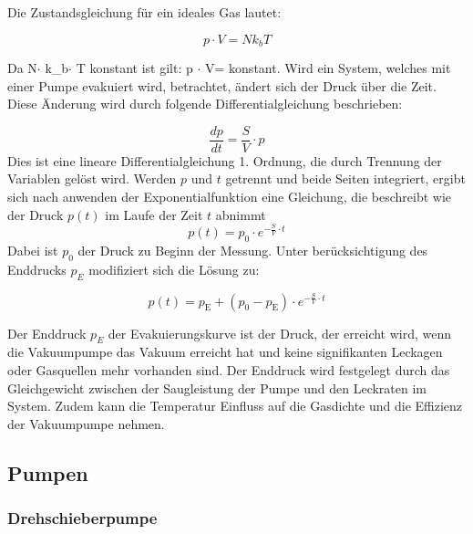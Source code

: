 Die Zustandsgleichung für ein ideales Gas lautet:

\begin{equation}
    p \cdot V=Nk_bT 
\end{equation}

Da N$\cdot$ k_b$\cdot$ T konstant ist gilt:  p $\cdot$ V= konstant.
Wird ein System, welches mit einer Pumpe evakuiert wird, betrachtet, ändert sich der Druck über die Zeit.
Diese Änderung wird durch folgende Differentialgleichung beschrieben:

\begin{equation}
    \frac{dp}{dt}=\frac{S}{V}\cdot p
\end{equation}
Dies ist eine lineare Differentialgleichung 1. Ordnung, die durch Trennung der Variablen gelöst wird.
Werden \(p \) und \(t \) getrennt und beide Seiten integriert, ergibt sich nach anwenden der Exponentialfunktion eine
Gleichung, die beschreibt wie der Druck \(p(t)\) im Laufe der Zeit \(t \) abnimmt
\begin{equation}
p(t)=p_0\cdot e^{-\frac{S}{V}\cdot t}
\end{equation}
Dabei ist \(p_0\) der Druck zu Beginn der Messung. Unter berücksichtigung des Enddrucks \(p_E\) modifiziert sich die Lösung zu: 
\cite{grundlagen_vakuumtechnik}

\begin{equation}
    p(t)=p_{\text{E}}+(p_0-p_{\text{E}})\cdot e^{-\frac{S}{V}\cdot t}
    \label{eq:druckkurve}
\end{equation}

Der Enddruck \(p_E\) der Evakuierungskurve ist der Druck, der erreicht wird, wenn die Vakuumpumpe das Vakuum erreicht hat und 
keine signifikanten Leckagen oder Gasquellen mehr vorhanden sind. Der Enddruck wird festgelegt durch das Gleichgewicht zwischen
der Saugleistung der Pumpe und den Leckraten im System. Zudem kann die Temperatur Einfluss auf die Gasdichte und die Effizienz 
der Vakuumpumpe nehmen.



\subsection{Pumpen}
\subsubsection{Drehschieberpumpe}


